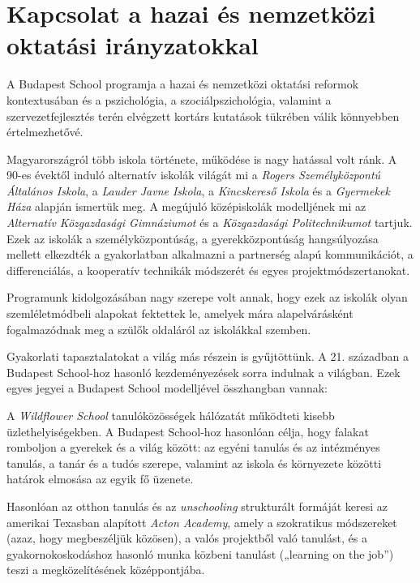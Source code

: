 \hypertarget{kapcsolat-a-hazai-es-nemzetkozi-oktatasi-iranyzatokkal}{%
\section{Kapcsolat a hazai és nemzetközi oktatási
irányzatokkal}\label{kapcsolat-a-hazai-es-nemzetkozi-oktatasi-iranyzatokkal}}

A Budapest School programja a hazai és nemzetközi oktatási reformok
kontextusában és a pszichológia, a szociálpszichológia, valamint a
szervezetfejlesztés terén elvégzett kortárs kutatások tükrében válik
könnyebben értelmezhetővé.

Magyarországról több iskola története, működése is nagy hatással volt
ránk. A 90-es évektől induló alternatív iskolák világát mi a
{\emph{Rogers Személyközpontú
Általános Iskola}}, a %
{\emph{Lauder
Javne Iskola}}, a
{\emph{Kincskereső Iskola}} és
a %
{\emph{Gyermekek Háza}} alapján
ismertük meg. A megújuló középiskolák modelljének mi az
{\emph{Alternatív Közgazdasági Gimnáziumot}}
és a %
{\emph{Közgazdasági Politechnikumot}}
tartjuk. Ezek az iskolák a személyközpontúság, a gyerekközpontúság
hangsúlyozása mellett elkezdték a gyakorlatban alkalmazni a partnerség
alapú kommunikációt, a differenciálás, a kooperatív technikák módszerét
és egyes projektmódszertanokat.

Programunk kidolgozásában nagy szerepe volt annak, hogy ezek az iskolák
olyan szemléletmódbeli alapokat fektettek le, amelyek mára
alapelvárásként fogalmazódnak meg a szülők oldaláról az iskolákkal
szemben.

Gyakorlati tapasztalatokat a világ más részein is gyűjtöttünk. A 21.
században a Budapest School-hoz hasonló kezdeményezések sorra indulnak a
világban. Ezek egyes jegyei a Budapest School modelljével összhangban
vannak:

A %
{\emph{Wildflower School}}
tanulóközösségek hálózatát működteti kisebb üzlethelyiségekben. A
Budapest School-hoz hasonlóan célja, hogy falakat\break
romboljon a gyerekek és
a világ között: az egyéni tanulás és az intézményes tanulás, a tanár és
a tudós szerepe, valamint az iskola és környezete közötti határok
elmosása az egyik fő üzenete.

Hasonlóan az otthon tanulás és az \emph{unschooling} strukturált
formáját keresi az amerikai Texasban alapított
{\emph{Acton Academy}}, amely a
szokratikus módszereket (azaz, hogy megbeszéljük közösen), a valós
projektből való tanulást, és a gyakornokoskodáshoz hasonló munka közbeni
tanulást („learning on the job'') teszi a megközelítésének középpontjába.

